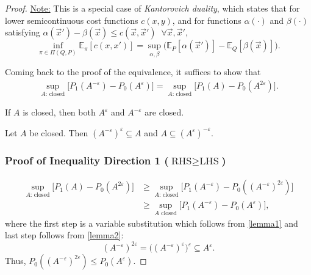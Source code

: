 \documentclass[11pt]{report}
\begin{document}
\begin{proof}
\smallskip
\noindent
\underline{Note:} This is a special case of \emph{Kantorovich duality}, which states that for lower semicontinuous cost functions \(c(x, y)\), and for functions \(\alpha(\cdot)\) and \(\beta(\cdot)\) satisfying \(\alpha(\vec{x}') - \beta(\vec{x}) \le c(\vec{x}, \vec{x}') \;\; \forall \vec{x}, \vec{x}'\),
\[
\inf_{\pi \in \Pi(Q, P)} \mathbb{E}_\pi[c(x, x')]
= \sup_{\alpha, \beta} \big( \mathbb{E}_P[\alpha(\vec{x}')] - \mathbb{E}_Q[\beta(\vec{x})] \big).
\]


\medskip
\noindent
Coming back to the proof of the equivalence, it suffices to show that
\begin{align*}
\sup_{A \text{: closed}} \big[ P_1(A^{-\varepsilon}) - P_0(A^\varepsilon) \big]
= \sup_{A \text{: closed}} \big[ P_1(A) - P_0(A^{2\varepsilon}) \big].
\end{align*}

\begin{lemma}
If \(A\) is closed, then both \(A^{\varepsilon}\) and \(A^{-\varepsilon}\) are closed.
\label{lemma1}
\end{lemma}

\begin{lemma}
Let \(A\) be closed. Then
\((A^{-\varepsilon})^{\varepsilon} \subseteq A\) and \(A \subseteq (A^{\varepsilon})^{-\varepsilon}\).
\label{lemma2}
\end{lemma}

\subsubsection{Proof of Inequality Direction 1 (\( \text{RHS} \ge \text{LHS} \))}

\begin{align*}
\sup_{A \text{: closed}} \big[ P_1(A) - P_0(A^{2\varepsilon}) \big]
&\ge \sup_{A \text{: closed}} \big[ P_1(A^{-\varepsilon}) - P_0((A^{-\varepsilon})^{2\varepsilon}) \big] \\
&\ge \sup_{A \text{ closed}} \big[ P_1(A^{-\varepsilon}) - P_0(A^{\varepsilon}) \big],
\end{align*}
where the first step is a variable substitution which follows from \ref{lemma1} and last step follows from \ref{lemma2}:
\[
(A^{-\varepsilon})^{2\varepsilon} = \big( (A^{-\varepsilon})^{\varepsilon} \big)^{\varepsilon}
\subseteq A^{\varepsilon}.
\]
Thus, \(P_0((A^{-\varepsilon})^{2\varepsilon}) \le P_0(A^{\varepsilon})\).



\end{proof}
\end{document}
